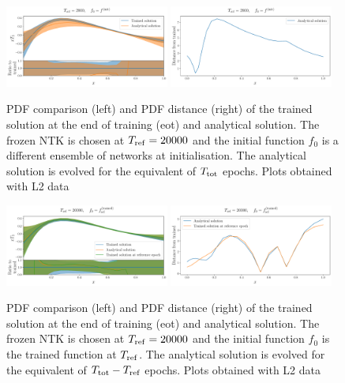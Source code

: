 \newpage


\begin{figure}[h]
    \centering
    \includegraphics[width=0.48\textwidth]{plots/pdf_plot_init.pdf}
    \includegraphics[width=0.48\textwidth]{plots/distance_plot_init.pdf}
    \caption{PDF comparison (left) and PDF distance (right) of the trained
    solution at the end of training (eot) and analytical solution. The frozen NTK
    is chosen at $T_{\rm ref} = 20000$ and the initial function $f_0$ is a
    different ensemble of networks at initialisation. The analytical solution is
    evolved for the equivalent of $T_{\rm tot}$ epochs. \ac{Plots obtained with L2
    data}}
    \label{fig:xT3_analytical_init}
  \end{figure}
  
  \begin{figure}[h]
    \centering
    \includegraphics[width=0.48\textwidth]{plots/pdf_plot_ref_20000.pdf}
    \includegraphics[width=0.48\textwidth]{plots/distance_plot_ref_20000.pdf}
    \caption{PDF comparison (left) and PDF distance (right) of the trained
    solution at the end of training (eot) and analytical solution. The frozen NTK
    is chosen at $T_{\rm ref} = 20000$ and the initial function $f_0$ is the
    trained function at $T_{\rm ref}$. The analytical solution is evolved for the
    equivalent of $T_{\rm tot} - T_{\rm ref}$ epochs. \ac{Plots obtained with L2
    data}}
    \label{fig:xT3_analytical_ref}
  \end{figure}
  
